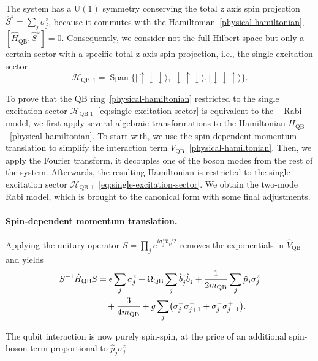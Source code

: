 \documentclass[reprint, aps, prx, amsmath, amssymb, longbibliography, superscriptaddress]{revtex4-2}
\DeclareMathOperator{\Zthree}{\mathbb{Z}_3}
\begin{document}
The system has a $\mathrm{U(1)}$ symmetry conserving the total z axis spin projection $\hat S^z = \sum_j
\sigma_j^z$, because it commutes with the Hamiltonian~\eqref{physical-hamiltonian}, $[ \hat H_{\text{QB}}, \hat S^z ] = 0$. Consequently, we consider not the full Hilbert space but only a certain sector with a specific total z axis spin projection, i.e., 
the single-excitation sector
\begin{equation}
\label{eq:single-excitation-sector}
  \mathcal H_{\text{QB},1} = \operatorname{Span}\bigl\{ |
    \uparrow\downarrow\downarrow\rangle,
    |\downarrow\uparrow\downarrow\rangle,
    |\downarrow\downarrow\uparrow\rangle \bigr\}.
\end{equation}

To prove that the QB ring~\eqref{physical-hamiltonian} restricted to the single excitation sector $\mathcal{H}_{\text{QB,1}}$~\eqref{eq:single-excitation-sector} is equivalent to the $\Zthree$ Rabi model, we first apply several algebraic transformations to the Hamiltonian $H_{\text{QB}}$~\eqref{physical-hamiltonian}. To start with, we use the spin-dependent momentum translation to simplify the interaction term $V_{\text{QB}}$~\eqref{physical-hamiltonian}. Then, we apply the Fourier transform, it decouples one of the boson modes from the rest of the system. Afterwards, the resulting Hamiltonian is restricted to the single-excitation sector $\mathcal{H}_{\text{QB},1}$~\eqref{eq:single-excitation-sector}. We obtain the two-mode $\Zthree$ Rabi model, which is brought to the canonical form with some final adjustments.

\paragraph{Spin-dependent momentum translation.}
Applying the unitary operator
$S = \prod_j e^{ i \sigma_j^z \hat x_j / 2 }$ removes the exponentials in
$\hat V_{\text{QB}}$ and yields
\begin{align}
\label{after-momentum-translation}
    S^{-1} \hat H_{\text{QB}} S &= \epsilon \sum_{j} \sigma_j^z
      + \Omega_{\text{QB}} \sum_j \hat b_j^{\dagger} \hat b_j
      + \frac{1}{2 m_{\text{QB}}} \sum_j \hat p_j \sigma_j^z \notag
      \\
      &\quad + \frac{3}{4 m_{\text{QB}}}
      + g \sum_{j}
        \bigl( \sigma_j^{+} \sigma_{j+1}^{-} + \sigma_j^{-} \sigma_{j+1}^{+} \bigr).
\end{align}

The qubit interaction is now purely spin-spin, at the price of an additional
spin-boson term proportional to $\hat p_j \sigma_j^z$.
\end{document}
